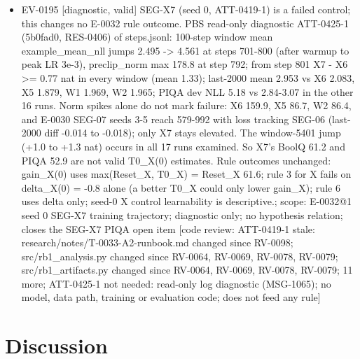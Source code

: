 \documentclass[11pt]{article}
\begin{document}
\begin{itemize}
\item EV-0195 [diagnostic, valid] SEG-X7 (seed 0, ATT-0419-1) is a failed control; this changes no E-0032 rule outcome. PBS read-only diagnostic ATT-0425-1 (5b0fad0, RES-0406) of steps.jsonl: 100-step window mean example\_mean\_nll jumps 2.495 -\textgreater{} 4.561 at steps 701-800 (after warmup to peak LR 3e-3), preclip\_norm max 178.8 at step 792; from step 801 X7 - X6 \textgreater{}= 0.77 nat in every window (mean 1.33); last-2000 mean 2.953 vs X6 2.083, X5 1.879, W1 1.969, W2 1.965; PIQA dev NLL 5.18 vs 2.84-3.07 in the other 16 runs. Norm spikes alone do not mark failure: X6 159.9, X5 86.7, W2 86.4, and E-0030 SEG-07 seeds 3-5 reach 579-992 with loss tracking SEG-06 (last-2000 diff -0.014 to -0.018); only X7 stays elevated. The window-5401 jump (+1.0 to +1.3 nat) occurs in all 17 runs examined. So X7's BoolQ 61.2 and PIQA 52.9 are not valid T0\_X(0) estimates. Rule outcomes unchanged: gain\_X(0) uses max(Reset\_X, T0\_X) = Reset\_X 61.6; rule 3 for X fails on delta\_X(0) = -0.8 alone (a better T0\_X could only lower gain\_X); rule 6 uses delta only; seed-0 X control learnability is descriptive.; scope: E-0032@1 seed 0 SEG-X7 training trajectory; diagnostic only; no hypothesis relation; closes the SEG-X7 PIQA open item [code review: ATT-0419-1 stale: research/notes/T-0033-A2-runbook.md changed since RV-0098; src/rb1\_analysis.py changed since RV-0064, RV-0069, RV-0078, RV-0079; src/rb1\_artifacts.py changed since RV-0064, RV-0069, RV-0078, RV-0079; 11 more; ATT-0425-1 not needed: read-only log diagnostic (MSG-1065); no model, data path, training or evaluation code; does not feed any rule]
\end{itemize}

\section{Discussion}
\end{document}
